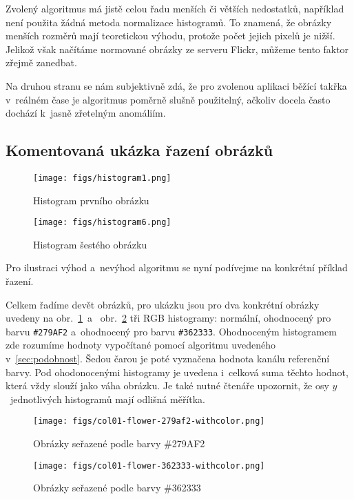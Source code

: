 \documentclass[12pt,oneside,a4paper]{article}
\begin{document}
Zvolený algoritmus má jistě celou řadu menších či větších nedostatků, například není použita žádná metoda normalizace histogramů. To znamená, že obrázky menších rozměrů mají teoretickou výhodu, protože počet jejich pixelů je nižší. Jelikož však načítáme normované obrázky ze serveru Flickr, můžeme tento faktor zřejmě zanedbat.

Na druhou stranu se nám subjektivně zdá, že pro zvolenou aplikaci běžící takřka v~reálném čase je algoritmus poměrně slušně použitelný, ačkoliv docela často dochází k~jasně zřetelným anomáliím.

\subsection{Komentovaná ukázka řazení obrázků}

\begin{figure} \begin{center}
\texttt{[image: figs/histogram1.png]} \caption{Histogram prvního obrázku}
\label{fig:manchild}
\end{center} \end{figure}
\begin{figure} \begin{center}
\texttt{[image: figs/histogram6.png]} \caption{Histogram šestého obrázku}
\label{fig:borderflower}
\end{center} \end{figure}
Pro ilustraci výhod a~nevýhod algoritmu se nyní podívejme na konkrétní příklad řazení.

Celkem řadíme devět obrázků, pro ukázku jsou pro dva konkrétní obrázky uvedeny na obr.~\ref{fig:manchild}~a~ obr.~\ref{fig:borderflower} tři RGB histogramy: normální, ohodnocený pro barvu \verb|#279AF2| a~ohodnocený pro barvu \verb|#362333|. Ohodnoceným histogramem zde rozumíme hodnoty vypočítané pomocí algoritmu uvedeného v~\ref{sec:podobnost}. Šedou čarou je poté vyznačena hodnota kanálu referenční barvy. Pod ohodonocenými histogramy je uvedena i~celková suma těchto hodnot, která vždy slouží jako váha obrázku. Je také nutné čtenáře upozornit, že osy $y$~jednotlivých histogramů mají odlišná měřítka.

\begin{figure} \begin{center}
\texttt{[image: figs/col01-flower-279af2-withcolor.png]} \caption{Obrázky seřazené podle barvy \#279AF2}
\label{fig:279af2}
\end{center} \end{figure}
\begin{figure} \begin{center}
\texttt{[image: figs/col01-flower-362333-withcolor.png]} \caption{Obrázky seřazené podle barvy \#362333}
\label{fig:362333}
\end{center} \end{figure}
\end{document}
